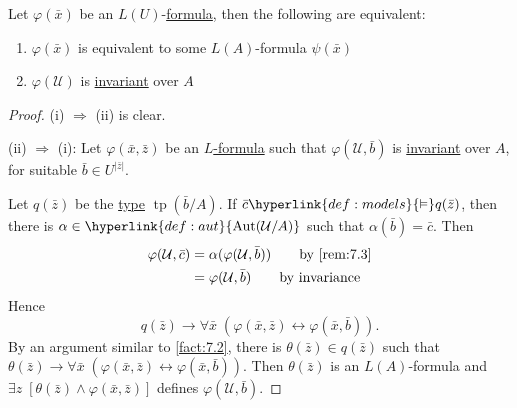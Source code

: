 \documentclass{article}
\let\models\vDash
\DeclareMathOperator{\Aut}{Aut}
\DeclareMathOperator{\tp}{tp}
\newcommand{\named}[1]{\textbf{#1}\index{#1}}
\begin{document}
\begin{nprop}\label{prop:7.5}
  Let $\varphi(\bar{x})$ be an \hyperlink{def:la}{$L(U)$}-\hyperlink{def:form}{formula}, then the following are equivalent:
  \begin{enumerate}[label=(\roman*)]
    \item $\varphi(\bar{x})$ is equivalent to some $L(A)$-formula $\psi(\bar{x})$
    \item $ \varphi(\mathcal{U}) $ is \hyperlink{def:inv}{invariant} over $A$
  \end{enumerate}
\end{nprop}
\begin{proof}
  (i) $\Rightarrow$ (ii) is clear.

  (ii) $\Rightarrow$ (i): Let $\varphi(\bar{x},\bar{z})$ be an \hyperlink{def:form}{$L$-formula} such that $\varphi(\mathcal{U},\bar{b})$ is \hyperlink{def:inv}{invariant} over $A$, for suitable $ \bar{b} \in U^{|\bar{z}|}$.

  Let $q(\bar{z})$ be the \hyperlink{def:type}{type} $\tp(\bar{b}/A)$.
  If $ \bar{c}\hyperlink{def:models}{\models} q(\bar{z}) $, then there is $ \alpha\in\hyperlink{def:aut}{\Aut(\mathcal{U}/A)}$
  such that $\alpha(\bar{b})=\bar{c}$.
  Then
    \begin{align*}
      \varphi(\mathcal{U},\bar{c})&=\alpha(\varphi(\mathcal{U},\bar{b}))\qquad\text{by \cref{rem:7.3}} \\
                                       &= \varphi(\mathcal{U},\bar{b})\qquad\text{by invariance}
    \end{align*}
  Hence
  \begin{equation*}
    q(\bar{z})\to \forall\bar{x}\;(\varphi(\bar{x},\bar{z})\leftrightarrow\varphi(\bar{x},\bar{b})).
  \end{equation*}
  By an argument similar to \cref{fact:7.2},
  there is $\theta(\bar{z})\in q(\bar{z})$ such that $\theta(\bar{z})\to\forall\bar{x}\;(\varphi(\bar{x},\bar{z})\leftrightarrow\varphi(\bar{x},\bar{b}))$.
  Then $\theta(\bar{z})$ is an $L(A)$-formula and $\exists z\;[\theta(\bar{z})\land\varphi(\bar{x},\bar{z})]$ defines $ \varphi(\mathcal{U},\bar{b}) $.
\end{proof}
\end{document}
